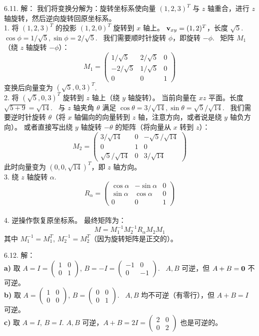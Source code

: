 \begin{exer}
6.11. 解：
我们将变换分解为：旋转坐标系使向量 $(1, 2, 3)^T$ 与 $z$ 轴重合，进行 $z$ 轴旋转，然后逆向旋转回原坐标系。
\\
1. 将 $(1, 2, 3)^T$ 的投影 $(1, 2, 0)^T$ 旋转到 $x$ 轴上。
$\mathbf{v}_{xy} = (1, 2)^T$，长度 $\sqrt{5}$.~$\cos \phi = 1/\sqrt{5}, \sin \phi = 2/\sqrt{5}$.~
我们需要顺时针旋转 $\phi$，即旋转 $-\phi$.~
矩阵 $M_1$（绕 $z$ 轴旋转 $-\phi$）：
$$
M_1 = \begin{pmatrix} 1/\sqrt{5} & 2/\sqrt{5} & 0 \\ -2/\sqrt{5} & 1/\sqrt{5} & 0 \\ 0 & 0 & 1 \end{pmatrix}
$$
变换后向量变为 $(\sqrt{5}, 0, 3)^T$.~
\\
2. 将 $(\sqrt{5}, 0, 3)^T$ 旋转到 $z$ 轴上（绕 $y$ 轴旋转）。
当前向量在 $xz$ 平面。长度 $\sqrt{5 + 9} = \sqrt{14}$.~
与 $z$ 轴夹角 $\theta$ 满足 $\cos \theta = 3/\sqrt{14}, \sin \theta = \sqrt{5}/\sqrt{14}$.~
我们需要逆时针旋转 $\theta$（将 $x$ 轴偏向的向量转到 $z$ 轴，注意方向，或者说是绕 $y$ 轴负方向）。
或者直接写出绕 $y$ 轴旋转 $-\theta$ 的矩阵（将向量从 $x$ 转到 $z$）：
$$
M_2 = \begin{pmatrix} 3/\sqrt{14} & 0 & -\sqrt{5}/\sqrt{14} \\ 0 & 1 & 0 \\ \sqrt{5}/\sqrt{14} & 0 & 3/\sqrt{14} \end{pmatrix}
$$
此时向量变为 $(0, 0, \sqrt{14})^T$，即 $z$ 轴方向。
\\
3. 绕 $z$ 轴旋转 $\alpha$.~
$$
R_\alpha = \begin{pmatrix} \cos \alpha & -\sin \alpha & 0 \\ \sin \alpha & \cos \alpha & 0 \\ 0 & 0 & 1 \end{pmatrix}
$$
\\
4. 逆操作恢复原坐标系。
最终矩阵为：
$$ M = M_1^{-1} M_2^{-1} R_\alpha M_2 M_1 $$
其中 $M_1^{-1} = M_1^T$, $M_2^{-1} = M_2^T$（因为旋转矩阵是正交的）。

6.12. 解：
\\
\textbf{a) }取 $A = I = \begin{pmatrix} 1 & 0 \\ 0 & 1 \end{pmatrix}$, $B = -I = \begin{pmatrix} -1 & 0 \\ 0 & -1 \end{pmatrix}$.~
$A, B$ 可逆，但 $A+B = \mathbf{0}$ 不可逆。
\\
\textbf{b) }取 $A = \begin{pmatrix} 1 & 0 \\ 0 & 0 \end{pmatrix}$, $B = \begin{pmatrix} 0 & 0 \\ 0 & 1 \end{pmatrix}$.~
$A, B$ 均不可逆（有零行），但 $A+B = I$ 可逆。
\\
\textbf{c) }取 $A = I$, $B = I$.
$A, B$ 可逆，$A+B = 2I = \begin{pmatrix} 2 & 0 \\ 0 & 2 \end{pmatrix}$ 也是可逆的。


\end{exer}
